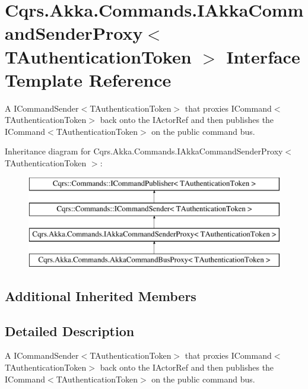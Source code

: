 \hypertarget{interfaceCqrs_1_1Akka_1_1Commands_1_1IAkkaCommandSenderProxy}{}\section{Cqrs.\+Akka.\+Commands.\+I\+Akka\+Command\+Sender\+Proxy$<$ T\+Authentication\+Token $>$ Interface Template Reference}
\label{interfaceCqrs_1_1Akka_1_1Commands_1_1IAkkaCommandSenderProxy}


A I\+Command\+Sender$<$\+T\+Authentication\+Token$>$ that proxies I\+Command$<$\+T\+Authentication\+Token$>$ back onto the I\+Actor\+Ref and then publishes the I\+Command$<$\+T\+Authentication\+Token$>$ on the public command bus.  


Inheritance diagram for Cqrs.\+Akka.\+Commands.\+I\+Akka\+Command\+Sender\+Proxy$<$ T\+Authentication\+Token $>$\+:\begin{figure}[H]
\begin{center}
\leavevmode
\includegraphics[height=4.000000cm]{interfaceCqrs_1_1Akka_1_1Commands_1_1IAkkaCommandSenderProxy}
\end{center}
\end{figure}
\subsection*{Additional Inherited Members}


\subsection{Detailed Description}
A I\+Command\+Sender$<$\+T\+Authentication\+Token$>$ that proxies I\+Command$<$\+T\+Authentication\+Token$>$ back onto the I\+Actor\+Ref and then publishes the I\+Command$<$\+T\+Authentication\+Token$>$ on the public command bus. 

